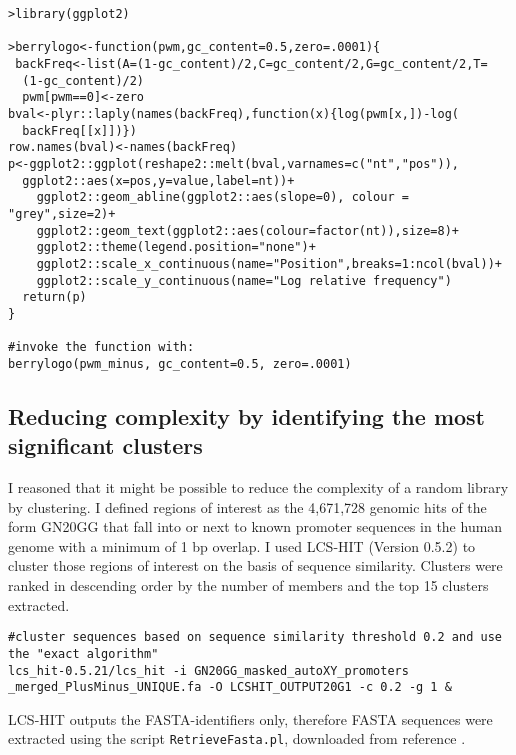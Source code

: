 \begin{lstlisting}
>library(ggplot2) 

>berrylogo<-function(pwm,gc_content=0.5,zero=.0001){
 backFreq<-list(A=(1-gc_content)/2,C=gc_content/2,G=gc_content/2,T=
  (1-gc_content)/2)
  pwm[pwm==0]<-zero
bval<-plyr::laply(names(backFreq),function(x){log(pwm[x,])-log(
  backFreq[[x]])})
row.names(bval)<-names(backFreq)
p<-ggplot2::ggplot(reshape2::melt(bval,varnames=c("nt","pos")),
  ggplot2::aes(x=pos,y=value,label=nt))+
    ggplot2::geom_abline(ggplot2::aes(slope=0), colour = "grey",size=2)+
    ggplot2::geom_text(ggplot2::aes(colour=factor(nt)),size=8)+
    ggplot2::theme(legend.position="none")+
    ggplot2::scale_x_continuous(name="Position",breaks=1:ncol(bval))+
    ggplot2::scale_y_continuous(name="Log relative frequency")
  return(p)
}

#invoke the function with:
berrylogo(pwm_minus, gc_content=0.5, zero=.0001)
\end{lstlisting}

\subsection{Reducing complexity by identifying the most significant clusters}

I reasoned that it might be possible to reduce the complexity of a random library by clustering. I defined regions of interest as the 4,671,728 genomic hits of the form GN20GG that fall into or next to known promoter sequences in the human genome with a minimum of 1 bp overlap. I used LCS-HIT (Version 0.5.2) \cite{Namiki:2013bv} to cluster those regions of interest on the basis of sequence similarity. Clusters were ranked in descending order by the number of members and the top 15 clusters extracted.

\begin{lstlisting}
#cluster sequences based on sequence similarity threshold 0.2 and use the "exact algorithm"
lcs_hit-0.5.21/lcs_hit -i GN20GG_masked_autoXY_promoters
_merged_PlusMinus_UNIQUE.fa -O LCSHIT_OUTPUT20G1 -c 0.2 -g 1 & 
\end{lstlisting}

LCS-HIT outputs the FASTA-identifiers only, therefore FASTA sequences were extracted using the script  \verb|RetrieveFasta.pl|, downloaded from reference \cite{Retrieve:Online}.

